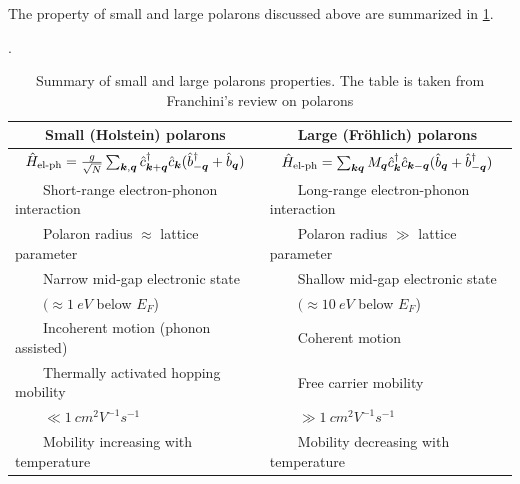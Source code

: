 The property of small and large polarons discussed above are summarized in \cref{tab:small_large}.

\newcommand{\tabitem}{~~\llap{\textbullet}~~}
\begin{table}[p]
    \centering
    \caption{Summary of small and large polarons properties. The table is taken from Franchini's review on polarons \cite{franchini2021b}}.
    \label{tab:small_large}
    \begin{tabular}{ll}
        \toprule
        \multicolumn{1}{c}{
        Small (Holstein) polarons                  }        & \multicolumn{1}{c}{ Large (Fröhlich) polarons                 } \\
        \midrule
        \multicolumn{1}{c}{
        $\hat{H}_\text{el-ph} = \frac{g}{\sqrt{N}}\sum_{\mathbf{\boldsymbol{k}}, \mathbf{\boldsymbol{q}}} \hat{c}^\dagger_{\mathbf{\boldsymbol{k}}+\mathbf{\boldsymbol{q}}} \hat{c}_{\mathbf{\boldsymbol{k}}} (\hat{b}^\dagger_{-\mathbf{\boldsymbol{q}}} + \hat{b}_{\mathbf{\boldsymbol{q}}})$
        }                                                   & \multicolumn{1}{c}{
        $\hat{H}_\text{el-ph} = \sum_{\mathbf{\boldsymbol{k}}\mathbf{\boldsymbol{q}}} M_{\mathbf{\boldsymbol{q}}}\hat{c}^\dagger_{\mathbf{\boldsymbol{k}}}\hat{c}_{\mathbf{\boldsymbol{k}}-\mathbf{\boldsymbol{q}}} (\hat{b}_{\mathbf{\boldsymbol{q}}} + \hat{b}^\dagger_{-\mathbf{\boldsymbol{q}}})$          }
        \\
        \midrule
        \tabitem Short-range electron-phonon interaction    & \tabitem Long-range electron-phonon interaction                 \\
        \tabitem Polaron radius $\approx$ lattice parameter & \tabitem Polaron radius $\gg$ lattice parameter                 \\
        \tabitem Narrow mid-gap electronic state            & \tabitem Shallow mid-gap electronic state                       \\
        $\qquad (\approx \SI{1}{eV}$ below $E_F$)           & $\qquad (\approx \SI{10}{eV}$ below $E_F$)                      \\

        \tabitem Incoherent motion (phonon assisted)        & \tabitem Coherent motion                                        \\
        \tabitem Thermally activated hopping mobility       & \tabitem Free carrier mobility                                  \\
        $\qquad \ll \SI{1}{cm^2 V^{-1} s^{-1}}$             & $\qquad \gg \SI{1}{cm^2 V^{-1} s^{-1}}$                         \\
        \tabitem Mobility increasing with temperature       & \tabitem Mobility decreasing with temperature                   \\
        \bottomrule
    \end{tabular}
\end{table}


